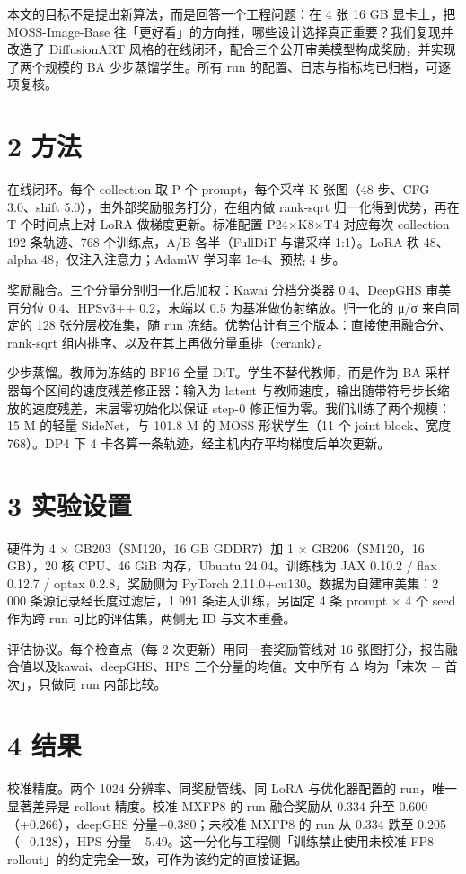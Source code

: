\documentclass[10.5pt,a4paper]{ctexart}
\begin{document}
本文的目标不是提出新算法，而是回答一个工程问题：在 4 张 16 GB 显卡上，把 MOSS-Image-Base 往「更好看」的方向推，哪些设计选择真正重要？我们复现并改造了 DiffusionART 风格的在线闭环，配合三个公开审美模型构成奖励，并实现了两个规模的 BA 少步蒸馏学生。所有 run 的配置、日志与指标均已归档，可逐项复核。

\section*{2 方法}
在线闭环。每个 collection 取 P 个 prompt，每个采样 K 张图（48 步、CFG 3.0、shift 5.0），由外部奖励服务打分，在组内做 rank-sqrt 归一化得到优势，再在 T 个时间点上对 LoRA 做梯度更新。标准配置 P24×K8×T4 对应每次 collection 192 条轨迹、768 个训练点，A/B 各半（FullDiT 与谱采样 1:1）。LoRA 秩 48、alpha 48，仅注入注意力；AdamW 学习率 1e-4、预热 4 步。

奖励融合。三个分量分别归一化后加权：Kawai 分档分类器 0.4、DeepGHS 审美百分位 0.4、HPSv3++ 0.2，末端以 0.5 为基准做仿射缩放。归一化的 μ/σ 来自固定的 128 张分层校准集，随 run 冻结。优势估计有三个版本：直接使用融合分、rank-sqrt 组内排序、以及在其上再做分量重排（rerank）。

少步蒸馏。教师为冻结的 BF16 全量 DiT。学生不替代教师，而是作为 BA 采样器每个区间的速度残差修正器：输入为 latent 与教师速度，输出随带符号步长缩放的速度残差，末层零初始化以保证 step-0 修正恒为零。我们训练了两个规模：15 M 的轻量 SideNet，与 101.8 M 的 MOSS 形状学生（11 个 joint block、宽度 768）。DP4 下 4 卡各算一条轨迹，经主机内存平均梯度后单次更新。

\section*{3 实验设置}
硬件为 4 × GB203（SM120，16 GB GDDR7）加 1 × GB206（SM120，16 GB），20 核 CPU、46 GiB 内存，Ubuntu 24.04。训练栈为 JAX 0.10.2 / flax 0.12.7 / optax 0.2.8，奖励侧为 PyTorch 2.11.0+cu130。数据为自建审美集：2 000 条源记录经长度过滤后，1 991 条进入训练，另固定 4 条 prompt × 4 个 seed 作为跨 run 可比的评估集，两侧无 ID 与文本重叠。

评估协议。每个检查点（每 2 次更新）用同一套奖励管线对 16 张图打分，报告融合值以及kawai、deepGHS、HPS 三个分量的均值。文中所有 Δ 均为「末次 − 首次」，只做同 run 内部比较。

\section*{4 结果}
校准精度。两个 1024 分辨率、同奖励管线、同 LoRA 与优化器配置的 run，唯一显著差异是 rollout 精度。校准 MXFP8 的 run 融合奖励从 0.334 升至 0.600（+0.266），deepGHS 分量+0.380；未校准 MXFP8 的 run 从 0.334 跌至 0.205（−0.128），HPS 分量 −5.49。这一分化与工程侧「训练禁止使用未校准 FP8 rollout」的约定完全一致，可作为该约定的直接证据。
\end{document}
